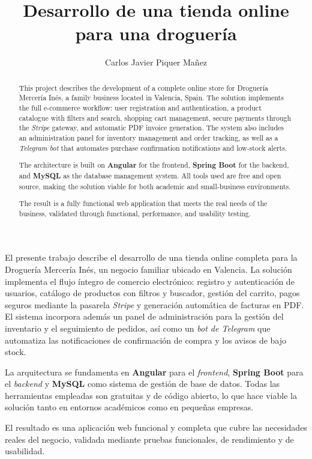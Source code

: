 \documentclass[twoside,spanish,a4paper,12pt]{tfg}
\title{Desarrollo de una tienda online para una droguería}
\author{Carlos Javier Piquer Mañez}
\begin{document}
\portada
\cleardoublepage
\contraportada
\cleardoublepage
\declaracion
\cleardoublepage


\cleardoublepage

\begin{resumen}
El presente trabajo describe el desarrollo de una tienda online completa para la Droguería Mercería Inés, un negocio familiar ubicado en Valencia. La solución implementa el flujo íntegro de comercio electrónico: registro y autenticación de usuarios, catálogo de productos con filtros y buscador, gestión del carrito, pagos seguros mediante la pasarela \textit{Stripe} y generación automática de facturas en PDF. El sistema incorpora además un panel de administración para la gestión del inventario y el seguimiento de pedidos, así como un \textit{bot de Telegram} que automatiza las notificaciones de confirmación de compra y los avisos de bajo stock.

La arquitectura se fundamenta en \textbf{Angular} para el \textit{frontend}, \textbf{Spring Boot} para el \textit{backend} y \textbf{MySQL} como sistema de gestión de base de datos. Todas las herramientas empleadas son gratuitas y de código abierto, lo que hace viable la solución tanto en entornos académicos como en pequeñas empresas.

El resultado es una aplicación web funcional y completa que cubre las necesidades reales del negocio, validada mediante pruebas funcionales, de rendimiento y de usabilidad.
\end{resumen}
\cleardoublepage

\begin{abstract}
This project describes the development of a complete online store for Droguería Mercería Inés, a family business located in Valencia, Spain. The solution implements the full e-commerce workflow: user registration and authentication, a product catalogue with filters and search, shopping cart management, secure payments through the \textit{Stripe} gateway, and automatic PDF invoice generation. The system also includes an administration panel for inventory management and order tracking, as well as a \textit{Telegram bot} that automates purchase confirmation notifications and low-stock alerts.

The architecture is built on \textbf{Angular} for the frontend, \textbf{Spring Boot} for the backend, and \textbf{MySQL} as the database management system. All tools used are free and open source, making the solution viable for both academic and small-business environments.

The result is a fully functional web application that meets the real needs of the business, validated through functional, performance, and usability testing.
\end{abstract}
\cleardoublepage
\end{document}
